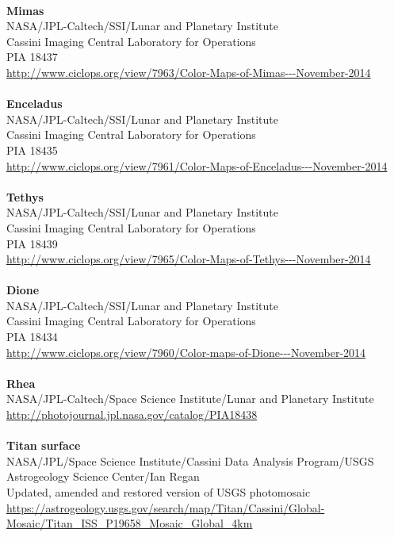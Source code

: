 \documentclass[Orbiter User Manual.tex]{subfiles}
\begin{document}
\\
\textbf{Mimas}\\
NASA/JPL-Caltech/SSI/Lunar and Planetary Institute\\
Cassini Imaging Central Laboratory for Operations\\
PIA 18437\\
\url{http://www.ciclops.org/view/7963/Color-Maps-of-Mimas---November-2014}\\
\\
\textbf{Enceladus}\\
NASA/JPL-Caltech/SSI/Lunar and Planetary Institute\\
Cassini Imaging Central Laboratory for Operations\\
PIA 18435\\
\url{http://www.ciclops.org/view/7961/Color-Maps-of-Enceladus---November-2014}\\
\\
\textbf{Tethys}\\
NASA/JPL-Caltech/SSI/Lunar and Planetary Institute\\
Cassini Imaging Central Laboratory for Operations\\
PIA 18439\\
\url{http://www.ciclops.org/view/7965/Color-Maps-of-Tethys---November-2014}\\
\\
\textbf{Dione}\\
NASA/JPL-Caltech/SSI/Lunar and Planetary Institute\\
Cassini Imaging Central Laboratory for Operations\\
PIA 18434\\
\url{http://www.ciclops.org/view/7960/Color-maps-of-Dione---November-2014}\\
\\
\textbf{Rhea}\\
NASA/JPL-Caltech/Space Science Institute/Lunar and Planetary Institute\\
\url{http://photojournal.jpl.nasa.gov/catalog/PIA18438}\\
\\
\textbf{Titan surface}\\
NASA/JPL/Space Science Institute/Cassini Data Analysis Program/USGS Astrogeology Science Center/Ian Regan\\
Updated, amended and restored version of USGS photomosaic\\
\url{https://astrogeology.usgs.gov/search/map/Titan/Cassini/Global-Mosaic/Titan_ISS_P19658_Mosaic_Global_4km}\\
\end{document}
